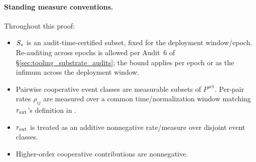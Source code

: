 \paragraph{Standing measure conventions.}
Throughout this proof:
\begin{itemize}
\item $S_*$ is an audit-time-certified subset, fixed for the
  deployment window/epoch.  Re-auditing across epochs is allowed
  per Audit~6 of \S\ref{sec:tooling_substrate_audits}; the bound
  applies per epoch or as the infimum across the deployment window.
\item Pairwise cooperative event classes are measurable subsets of
  $P^{\mathrm{act}}$.  Per-pair rates $\rho_{ij}$ are measured over
  a common time/normalization window matching $r_{\mathrm{ext}}$'s definition
  in \citep[Horizon~Aware]{lasser2026horizon}.
\item $r_{\mathrm{ext}}$ is treated as an additive nonnegative
  rate/measure over disjoint event classes.
\item Higher-order cooperative contributions are nonnegative.
\end{itemize}

